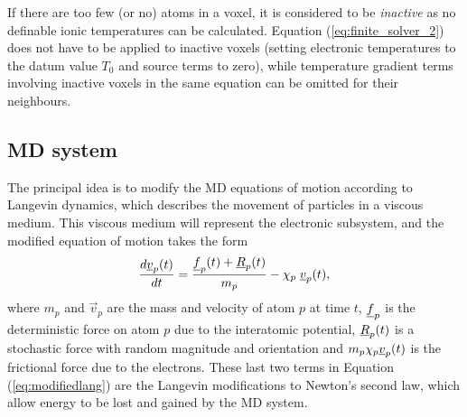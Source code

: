 If there are too few (or no) atoms in a voxel, it is considered to be
\emph{inactive} as no definable ionic temperatures can be calculated.
Equation (\ref{eq:finite_solver_2}) does not have to be applied to
inactive voxels (setting electronic temperatures to the datum value $T_0$
and source terms to zero), while temperature gradient terms involving
inactive voxels in the same equation can be omitted for their neighbours.

\subsection*{MD system}

The principal idea is to modify the MD equations of motion
according to Langevin
dynamics,
which describes the movement of particles in a viscous medium.
This viscous medium will represent the electronic subsystem, and the
modified equation of motion takes the form
\begin{equation} \label{eq:modifiedlang}
{d \mbox{$\underline{v}$}_{p}(t) \over d t} = {{\mbox{$\underline{f}$}_{p}(t)+\mbox{$\underline{R}$}_{p}(t)} \over
m_{p}} - \chi_{p} \; \mbox{$\underline{v}$}_{p}(t),
\end{equation}
where $m_p$ and $\vec{v}_p$ are the mass and velocity of atom $p$
at time $t$, $\mbox{$\underline{f}$}_{p}$ is the deterministic force on atom $p$ due
to the interatomic potential, $\mbox{$\underline{R}$}_{p}(t)$ is a stochastic force with
random magnitude and orientation and $m_{p} \chi_{p} \mbox{$\underline{v}$}_{p}(t)$
is the frictional force due to the electrons. These last two terms in
Equation (\ref{eq:modifiedlang}) are the Langevin modifications to
Newton's second law, which allow energy to be lost and gained by
the MD system.

